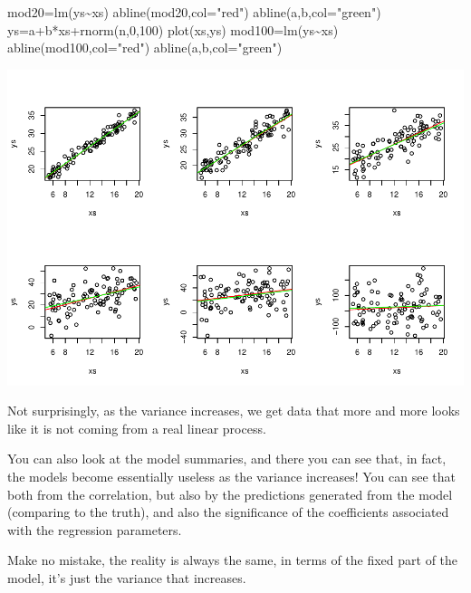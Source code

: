 \documentclass[
]{book}
\newenvironment{Shaded}{\begin{snugshade}}{\end{snugshade}}
\newcommand{\AttributeTok}[1]{\textcolor[rgb]{0.77,0.63,0.00}{#1}}
\newcommand{\DecValTok}[1]{\textcolor[rgb]{0.00,0.00,0.81}{#1}}
\newcommand{\FunctionTok}[1]{\textcolor[rgb]{0.00,0.00,0.00}{#1}}
\newcommand{\NormalTok}[1]{#1}
\newcommand{\OtherTok}[1]{\textcolor[rgb]{0.56,0.35,0.01}{#1}}
\newcommand{\SpecialCharTok}[1]{\textcolor[rgb]{0.00,0.00,0.00}{#1}}
\newcommand{\StringTok}[1]{\textcolor[rgb]{0.31,0.60,0.02}{#1}}
\begin{document}
\begin{Shaded}
\begin{Highlighting}[]
\NormalTok{mod20}\OtherTok{=}\FunctionTok{lm}\NormalTok{(ys}\SpecialCharTok{\textasciitilde{}}\NormalTok{xs)}
\FunctionTok{abline}\NormalTok{(mod20,}\AttributeTok{col=}\StringTok{"red"}\NormalTok{)}
\FunctionTok{abline}\NormalTok{(a,b,}\AttributeTok{col=}\StringTok{"green"}\NormalTok{)}
\NormalTok{ys}\OtherTok{=}\NormalTok{a}\SpecialCharTok{+}\NormalTok{b}\SpecialCharTok{*}\NormalTok{xs}\SpecialCharTok{+}\FunctionTok{rnorm}\NormalTok{(n,}\DecValTok{0}\NormalTok{,}\DecValTok{100}\NormalTok{)}
\FunctionTok{plot}\NormalTok{(xs,ys)}
\NormalTok{mod100}\OtherTok{=}\FunctionTok{lm}\NormalTok{(ys}\SpecialCharTok{\textasciitilde{}}\NormalTok{xs)}
\FunctionTok{abline}\NormalTok{(mod100,}\AttributeTok{col=}\StringTok{"red"}\NormalTok{)}
\FunctionTok{abline}\NormalTok{(a,b,}\AttributeTok{col=}\StringTok{"green"}\NormalTok{)}
\end{Highlighting}
\end{Shaded}

\includegraphics{ECOMODbook_files/figure-latex/a6.27-1.pdf}

Not surprisingly, as the variance increases, we get data that more and more looks like it is not coming from a real linear process.

You can also look at the model summaries, and there you can see that, in fact, the models become essentially useless as the variance increases! You can see that both from the correlation, but also by the predictions generated from the model (comparing to the truth), and also the significance of the coefficients associated with the regression parameters.

Make no mistake, the reality is always the same, in terms of the fixed part of the model, it's just the variance that increases.
\end{document}
